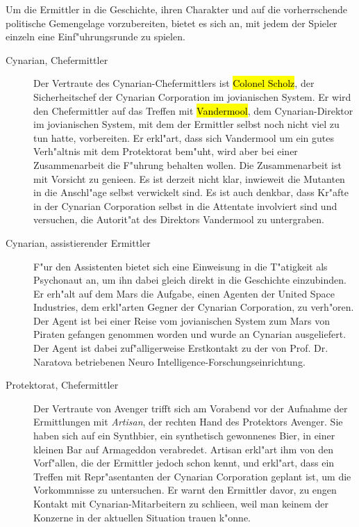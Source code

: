 
Um die Ermittler in die Geschichte, ihren Charakter und auf die vorherrschende politische Gemengelage vorzubereiten, bietet es sich an, mit jedem der Spieler einzeln eine Einf"uhrungsrunde zu spielen.

\begin{description}
\item [Cynarian, Chefermittler] Der Vertraute des Cynarian-Chefermittlers ist \hl{Colonel Scholz}, der Sicherheitschef der Cynarian 	
		Corporation im jovianischen System. Er wird den Chefermittler auf das Treffen mit \hl{Vandermool}, dem Cynarian-Direktor im jovianischen System, mit dem der Ermittler selbst noch nicht viel zu tun hatte, vorbereiten. Er erkl"art, dass sich Vandermool um ein gutes Verh"altnis mit dem Protektorat bem"uht, wird aber bei einer Zusammenarbeit die F"uhrung behalten wollen. Die Zusammenarbeit ist mit Vorsicht zu genie\3en. Es ist derzeit nicht klar, inwieweit die Mutanten in die Anschl"age selbst verwickelt sind. Es ist auch denkbar, dass Kr"afte in der Cynarian Corporation selbst in die Attentate involviert sind und versuchen, die Autorit"at des Direktors Vandermool zu untergraben.
	\item [Cynarian, assistierender Ermittler] F"ur den Assistenten bietet sich eine Einweisung in die T"atigkeit als Psychonaut an, um ihn 
		dabei gleich direkt in die Geschichte einzubinden. Er erh"alt auf dem Mars die Aufgabe, einen Agenten der United Space Industries, dem erkl"arten Gegner der Cynarian Corporation, zu verh"oren. Der Agent ist bei einer Reise vom jovianischen System zum Mars von Piraten gefangen genommen worden und wurde an Cynarian ausgeliefert. Der Agent ist dabei zuf"alligerweise Erstkontakt zu der von Prof. Dr. Naratova betriebenen Neuro Intelligence-Forschungseinrichtung.
	\item [Protektorat, Chefermittler] Der Vertraute von Avenger trifft sich am Vorabend vor der Aufnahme der Ermittlungen mit 
		\emph{Artisan}, der rechten Hand des Protektors Avenger. Sie haben sich auf ein Synthbier, ein synthetisch gewonnenes Bier, in einer kleinen Bar auf Armageddon verabredet. Artisan erkl"art ihm von den Vorf"allen, die der Ermittler jedoch schon kennt, und erkl"art, dass ein Treffen mit Repr"asentanten der Cynarian Corporation geplant ist, um die Vorkommnisse zu untersuchen. Er warnt den Ermittler davor, zu engen Kontakt mit Cynarian-Mitarbeitern zu schlie\3en, weil man keinem der Konzerne in der aktuellen Situation trauen k"onne. 

\end{description}
